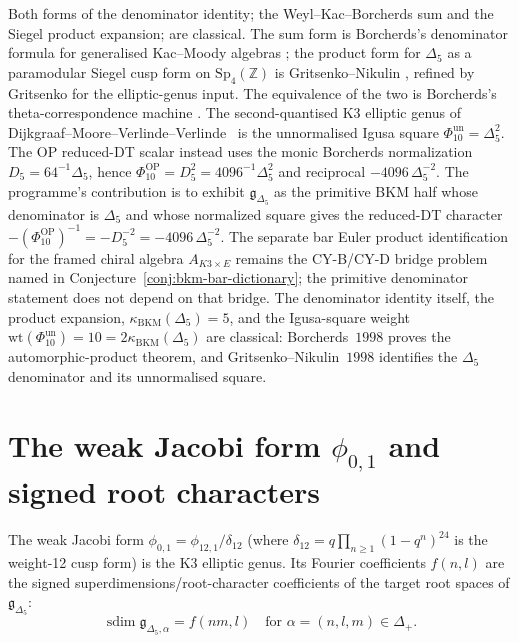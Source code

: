 \begin{remark}
\label{rem:k3e-denominator-classical}
Both forms of the denominator identity; the Weyl--Kac--Borcherds sum
and the Siegel product expansion; are classical. The sum form is
Borcherds's denominator formula for generalised Kac--Moody algebras
\cite{Borcherds1992}; the product form for $\Delta_5$ as a paramodular
Siegel cusp form on $\mathrm{Sp}_4(\mathbb{Z})$ is Gritsenko--Nikulin
\cite{GritsenkoNikulin1995,GritsenkoNikulin1998}, refined by Gritsenko
\cite{Gritsenko1999} for the elliptic-genus input. The equivalence of
the two is Borcherds's theta-correspondence machine
\cite{Borcherds1998}. The second-quantised K3 elliptic genus of
Dijkgraaf--Moore--Verlinde--Verlinde~\cite{DMVV} is the unnormalised
Igusa square \(\Phi_{10}^{\mathrm{un}}=\Delta_5^2\). The OP reduced-DT
scalar instead uses the monic Borcherds normalization
\(D_5=64^{-1}\Delta_5\), hence
\(\Phi_{10}^{\mathrm{OP}}=D_5^2=4096^{-1}\Delta_5^2\) and reciprocal
\(-4096\,\Delta_5^{-2}\). The programme's contribution is to exhibit
$\mathfrak{g}_{\Delta_5}$ as the primitive BKM half whose denominator is
$\Delta_5$ and whose normalized square gives the reduced-DT character
\(-(\Phi_{10}^{\mathrm{OP}})^{-1}=-D_5^{-2}=-4096\,\Delta_5^{-2}\).
The separate bar Euler product
identification for the framed chiral algebra $A_{K3 \times E}$ remains
the CY-B/CY-D bridge problem named in Conjecture~\ref{conj:bkm-bar-dictionary};
the primitive denominator statement does not depend on that bridge. The denominator identity itself, the product
expansion, $\kappa_{\mathrm{BKM}}(\Delta_5)=5$, and the Igusa-square
weight \(\mathrm{wt}(\Phi_{10}^{\mathrm{un}})=10=2\kappa_{\mathrm{BKM}}(\Delta_5)\)
are classical: Borcherds~$1998$ proves the automorphic-product theorem,
and Gritsenko--Nikulin~$1998$ identifies the \(\Delta_5\) denominator and
its unnormalised square.
\end{remark}

\section{The weak Jacobi form \texorpdfstring{$\phi_{0,1}$}{phi-0,1} and signed root characters}
\label{sec:k3e-phi01}

The weak Jacobi form $\phi_{0,1} = \phi_{12,1}/\delta_{12}$ (where $\delta_{12} = q \prod_{n \geq 1} (1 - q^n)^{24}$ is the weight-12 cusp form) is the K3 elliptic genus. Its Fourier coefficients $f(n,l)$ are the signed superdimensions/root-character coefficients of the target root spaces of $\mathfrak{g}_{\Delta_5}$:
\[
 \operatorname{sdim}\mathfrak g_{\Delta_5,\alpha} = f(nm, l) \quad \text{for } \alpha = (n,l,m) \in \Delta_+.
\]

